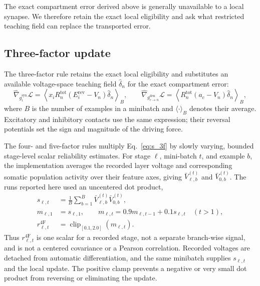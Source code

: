 The exact compartment error derived above is generally unavailable to a local
synapse. We therefore retain the exact local eligibility and ask what
restricted teaching field can replace the transported error.

\subsection{Three-factor update}

The three-factor rule retains the exact local eligibility and substitutes an
available voltage-space teaching field $\widehat\delta_n$ for the exact
compartment error:
\begin{equation}
\widehat\nabla_{g_i^{\mathrm{syn}}}\mathcal L
=\left\langle x_iR_n^{\mathrm{tot}}(E_i^{\mathrm{rev}}-V_n)
\widehat\delta_n\right\rangle_B,
\qquad
\widehat\nabla_{g_{c\to n}^{\mathrm{den}}}\mathcal L
=\left\langle R_n^{\mathrm{tot}}(a_c-V_n)
\widehat\delta_n\right\rangle_B,
\label{eq:s_3f}
\end{equation}
where $B$ is the number of examples in a minibatch and
$\langle\cdot\rangle_B$ denotes their average. Excitatory and
inhibitory contacts use the same expression; their reversal potentials set the
sign and magnitude of the driving force.

The four- and five-factor rules multiply Eq.~\ref{eq:s_3f} by slowly varying,
bounded stage-level scalar reliability estimates. For stage $\ell$, mini-batch $t$, and example
$b$, the implementation averages the recorded layer voltage and corresponding
somatic population activity over their feature axes, giving $\bar V_{\ell,b}^{(t)}$ and
$\bar V_{0,b}^{(t)}$. The runs reported here used an uncentered dot product,
\begin{align}
s_{\ell,t}&=\frac{1}{B}\sum_{b=1}^{B}
 \bar V_{\ell,b}^{(t)}\bar V_{0,b}^{(t)},\\
m_{\ell,1}&=s_{\ell,1},\qquad
m_{\ell,t}=0.9m_{\ell,t-1}+0.1s_{\ell,t}\quad(t>1),\\
r_{\ell,t}^{\mathrm{4F}}&=\operatorname{clip}_{[0.1,2.0]}(m_{\ell,t}).
\label{eq:s_4f}
\end{align}
Thus $r_{\ell,t}^{\mathrm{4F}}$ is one scalar for a recorded stage, not a
separate branch-wise signal, and is not a centered covariance or a Pearson
correlation. Recorded voltages are detached from automatic differentiation,
and the same minibatch supplies $s_{\ell,t}$ and the local update. The positive
clamp prevents a negative or very small dot product from reversing or
eliminating the update.

